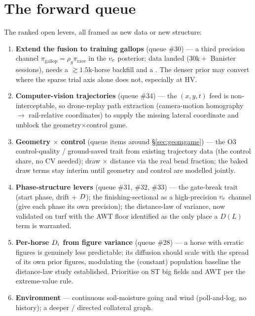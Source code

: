 \section{The forward queue}

The ranked open levers, all framed as new data or new structure:
\begin{enumerate}[label=\textbf{Q\arabic*.},leftmargin=*]
  \item \textbf{Extend the fusion to training gallops} (queue \#30) --- a third precision channel
        $\pi_{\text{gallop}}=\rho_g\pi_{\text{race}}$ in the ${v_{c}}$ posterior; data landed
        ($30\text{k}+$ Banister sessions), needs a $\gtrsim\!1.5\text{k}$-horse backfill and a
        . The denser prior may convert where the sparse trial axis alone does
        not, especially at HV.
  \item \textbf{Computer-vision trajectories} (queue \#34) --- the $(x,y,t)$ feed is
        non-interceptable, so drone-replay path extraction (camera-motion homography $\to$
        rail-relative coordinates) to supply the missing lateral coordinate and unblock the
        geometry$\times$control game.
  \item \textbf{Geometry $\times$ control} (queue items around \S\ref{sec:geomgame}) --- the O3
        control-quality / ground-saved trait from existing trajectory data (the control share, no CV
        needed); draw $\times$ distance via the real bend fraction; the baked draw terms stay interim
        until geometry and control are modelled jointly.
  \item \textbf{Phase-structure levers} (queue \#31, \#32, \#33) --- the gate-break trait (start
        phase, drift + $D$); the finishing-sectional as a high-precision ${v_{c}}$ channel
        (give each phase its own precision); the distance-law of variance, now validated on turf
        with the AWT floor identified as the only place a $D(L)$ term is warranted.
  \item \textbf{Per-horse $D_i$ from figure variance} (queue \#28) --- a horse with erratic
        figures is genuinely less predictable; its diffusion should scale with the spread of its own
        prior figures, modulating the (constant) population baseline the distance-law study
        established. Prioritise on ST big fields and AWT per the extreme-value rule.
  \item \textbf{Environment} --- continuous soil-moisture going and wind (poll-and-log, no history);
        a deeper / directed collateral graph.
\end{enumerate}

